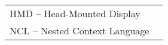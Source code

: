 
\begin{thenotations}

  \noindent
  \begin{tabular}{ll}
HMD -- Head-Mounted Display\\
NCL -- Nested Context Language\\

  \end{tabular}

\end{thenotations}